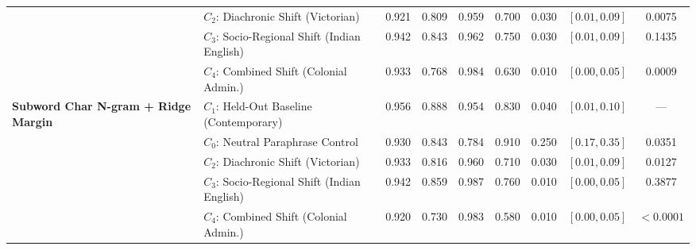 \begin{table}[!t]
{\begin{tabular}{llccccccc}
 & $C_2$: Diachronic Shift (Victorian) & 0.921 & 0.809 & 0.959 & 0.700 & 0.030 & $[0.01, 0.09]$ & 0.0075 \\
 & $C_3$: Socio-Regional Shift (Indian English) & 0.942 & 0.843 & 0.962 & 0.750 & 0.030 & $[0.01, 0.09]$ & 0.1435 \\
 & $C_4$: Combined Shift (Colonial Admin.) & 0.933 & 0.768 & 0.984 & 0.630 & 0.010 & $[0.00, 0.05]$ & 0.0009 \\
\midrule
\multirow{5}{*}{\textbf{Subword Char N-gram + Ridge Margin}} 
 & $C_1$: Held-Out Baseline (Contemporary) & 0.956 & 0.888 & 0.954 & 0.830 & 0.040 & $[0.01, 0.10]$ & --- \\
 & $C_0$: Neutral Paraphrase Control & 0.930 & 0.843 & 0.784 & 0.910 & 0.250 & $[0.17, 0.35]$ & 0.0351 \\
 & $C_2$: Diachronic Shift (Victorian) & 0.933 & 0.816 & 0.960 & 0.710 & 0.030 & $[0.01, 0.09]$ & 0.0127 \\
 & $C_3$: Socio-Regional Shift (Indian English) & 0.942 & 0.859 & 0.987 & 0.760 & 0.010 & $[0.00, 0.05]$ & 0.3877 \\
 & $C_4$: Combined Shift (Colonial Admin.) & 0.920 & 0.730 & 0.983 & 0.580 & 0.010 & $[0.00, 0.05]$ & $< 0.0001$ \\
\bottomrule
\end{tabular}
}
\end{table}
